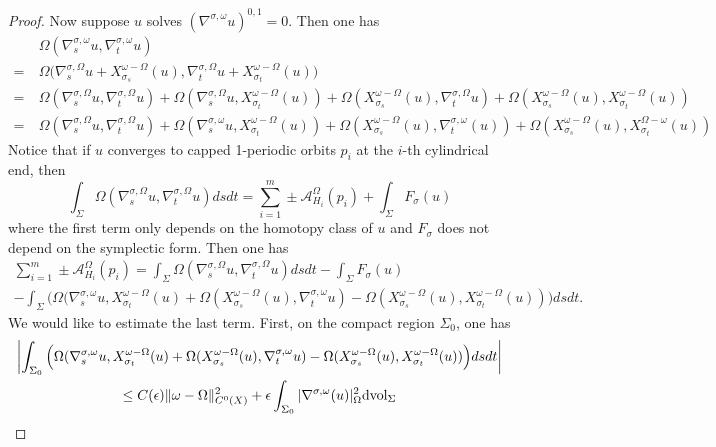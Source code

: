 \documentclass[reqno, 10pt]{amsart}
\numberwithin{equation}{section}
\numberwithin{equation}{section}
\theoremstyle{definition}
\theoremstyle{remark}
\newcommand{\beqn}{\begin{equation*}}
\newcommand{\eeqn}{\end{equation*}}
\newcommand{\mc}{\mathcal}
\begin{document}
\begin{proof}
Now suppose $u$ solves $(\nabla^{\sigma, \omega} u)^{0,1} = 0$. Then one has 
\beqn
\begin{split}
&\ \Omega(\nabla_s^{\sigma, \omega} u, \nabla_t^{\sigma, \omega} u)\\
= &\  \Omega \Big( \nabla_s^{\sigma, \Omega} u + X_{\sigma_s}^{\omega-\Omega}(u), \nabla_t^{\sigma, \Omega} u + X_{\sigma_t}^{\omega-\Omega}(u) \Big)\\
 = &\ \Omega( \nabla_s^{\sigma, \Omega} u , \nabla_t^{\sigma, \Omega} u) + \Omega( \nabla_s^{\sigma, \Omega} u, X_{\sigma_t}^{\omega - \Omega} (u)) + \Omega( X_{\sigma_s}^{\omega - \Omega}(u), \nabla_t^{\sigma, \Omega} u ) + \Omega( X_{\sigma_s}^{\omega - \Omega}(u), X_{\sigma_t}^{\omega - \Omega}(u))\\
 = &\ \Omega( \nabla_s^{\sigma, \Omega}u, \nabla_t^{\sigma, \Omega}u) + \Omega( \nabla_s^{\sigma, \omega}u, X_{\sigma_t}^{\omega-\Omega}(u)) + \Omega( X_{\sigma_s}^{\omega-\Omega}(u), \nabla_t^{\sigma, \omega}(u)) + \Omega( X_{\sigma_s}^{\omega-\Omega}(u), X_{\sigma_t}^{\Omega- \omega}(u)) 
 \end{split}
\eeqn
Notice that if $u$ converges to capped 1-periodic orbits $p_i$ at the $i$-th cylindrical end, then 
\beqn
\int_\Sigma \Omega(\nabla_s^{\sigma, \Omega} u, \nabla_t^{\sigma, \Omega} u) ds dt =  \sum_{i=1}^m \pm {\mc A}_{H_i}^\Omega(p_i) + \int_\Sigma F_\sigma(u)
\eeqn
where the first term only depends on the homotopy class of $u$ and $F_\sigma$ does not depend on the symplectic form. Then one has
\begin{multline*}
\sum_{i=1}^m \pm {\mc A}_{H_i}^\Omega(p_i) = \int_\Sigma \Omega(\nabla_s^{\sigma, \Omega} u, \nabla_t^{\sigma, \Omega} u) ds dt-  \int_\Sigma F_\sigma(u) \\
- \int_\Sigma \Big(  \Omega( \nabla_s^{\sigma, \omega} u, X_{\sigma_t}^{\omega-\Omega}(u) + \Omega( X_{\sigma_s}^{\omega-\Omega} (u), \nabla_t^{\sigma, \omega}u) - \Omega( X_{\sigma_s}^{\omega-\Omega}(u), X_{\sigma_t}^{\omega-\Omega}(u)) \Big) dsdt.
\end{multline*}
We would like to estimate the last term. First, on the compact region $\Sigma_0$, one has 
\begin{multline*}
\left| \int_{\Sigma_0} \Big(  \Omega( \nabla_s^{\sigma, \omega} u, X_{\sigma_t}^{\omega-\Omega}(u) + \Omega( X_{\sigma_s}^{\omega-\Omega} (u), \nabla_t^{\sigma, \omega}u) - \Omega( X_{\sigma_s}^{\omega-\Omega}(u), X_{\sigma_t}^{\omega-\Omega}(u)) \Big) dsdt \right| \\
\leq C (\epsilon) \| \omega - \Omega\|_{C^0(X)}^2 + \epsilon \int_{\Sigma_0} | \nabla^{\sigma, \omega} (u) |_\Omega^2 {\rm dvol}_\Sigma

\end{multline*}
\end{proof}
\end{document}
